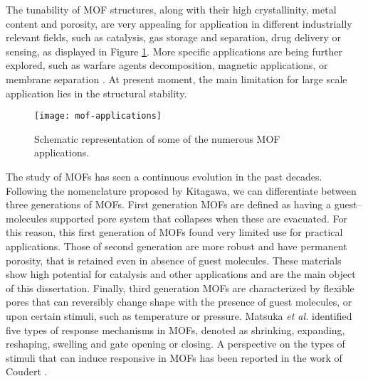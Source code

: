 \npar
\npar
The tunability of MOF structures, along with their high crystallinity, metal content and porosity, are very appealing for application in different industrially relevant fields, such as catalysis, gas storage and separation, drug delivery or sensing, as displayed in Figure \ref{fig:mof-applications}. More specific applications are being further explored, such as warfare agents decomposition, magnetic applications, or membrane separation \cite{furukawa2013chemistry}. At present moment, the main limitation for large scale application lies in the structural stability. 
%
%
\begin{figure}[htbp]
	\centering
 	\texttt{[image: mof-applications]}
	\caption{Schematic representation of some of the numerous MOF applications.}
	\label{fig:mof-applications}
\end{figure}
%
\npar
The study of MOFs has seen a continuous evolution in the past decades.
Following the nomenclature proposed by Kitagawa, we can differentiate between three generations of MOFs\cite{kitagawa1998functional}. First generation MOFs are defined as having a guest--molecules supported pore system that collapses when these are evacuated. For this reason, this first generation of MOFs found very limited use for practical applications. Those of second generation are more robust and have permanent porosity, that is retained even in absence of guest molecules. These materials show high potential for catalysis and other applications and are the main object of this dissertation. Finally, third generation MOFs are characterized by flexible pores that can reversibly change shape with the presence of guest molecules, or upon certain stimuli, such as temperature or pressure. Matsuka \textit{et al.}\cite{matsuda2004guest} identified five types of response mechanisms in MOFs, denoted as shrinking, expanding, reshaping, swelling and gate opening or closing. A perspective on the types of stimuli that can induce responsive in MOFs has been reported in the work of Coudert \cite{coudert2015responsive}.


